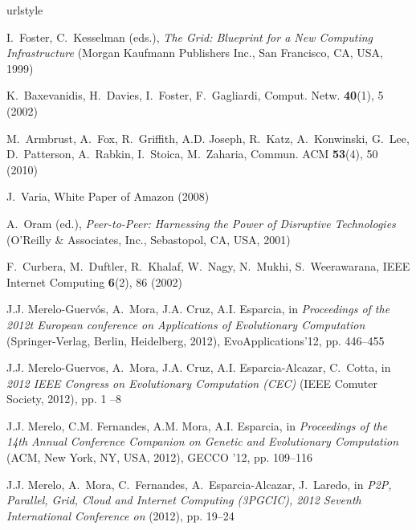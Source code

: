 %
%
\begin{thebibliography}{10}
\providecommand{\url}[1]{{#1}}
\providecommand{\urlprefix}{URL }
\expandafter\ifx\csname urlstyle\endcsname\relax
  \providecommand{\doi}[1]{DOI \discretionary{}{}{}#1}\else
  \providecommand{\doi}{DOI \discretionary{}{}{}\begingroup
  \urlstyle{rm}\Url}\fi

I.~Foster, C.~Kesselman (eds.), \emph{The Grid: Blueprint for a New Computing
  Infrastructure} (Morgan Kaufmann Publishers Inc., San Francisco, CA, USA,
  1999)

K.~Baxevanidis, H.~Davies, I.~Foster, F.~Gagliardi, Comput. Netw.
  \textbf{40}(1), 5 (2002)

M.~Armbrust, A.~Fox, R.~Griffith, A.D. Joseph, R.~Katz, A.~Konwinski, G.~Lee,
  D.~Patterson, A.~Rabkin, I.~Stoica, M.~Zaharia, Commun. ACM \textbf{53}(4),
  50 (2010)

J.~Varia, White Paper of Amazon  (2008)

A.~Oram (ed.), \emph{Peer-to-Peer: Harnessing the Power of Disruptive
  Technologies} (O'Reilly \& Associates, Inc., Sebastopol, CA, USA, 2001)

F.~Curbera, M.~Duftler, R.~Khalaf, W.~Nagy, N.~Mukhi, S.~Weerawarana, IEEE
  Internet Computing \textbf{6}(2), 86 (2002)

J.J. Merelo-Guerv\'{o}s, A.~Mora, J.A. Cruz, A.I. Esparcia, in
  \emph{Proceedings of the 2012t European conference on Applications of
  Evolutionary Computation} (Springer-Verlag, Berlin, Heidelberg, 2012),
  EvoApplications'12, pp. 446--455

J.J. Merelo-Guervos, A.~Mora, J.A. Cruz, A.I. Esparcia-Alcazar, C.~Cotta, in
  \emph{2012 IEEE Congress on Evolutionary Computation (CEC)} (IEEE Comuter
  Society, 2012), pp. 1 --8

J.J. Merelo, C.M. Fernandes, A.M. Mora, A.I. Esparcia, in \emph{Proceedings of
  the 14th Annual Conference Companion on Genetic and Evolutionary Computation}
  (ACM, New York, NY, USA, 2012), GECCO '12, pp. 109--116

J.J. Merelo, A.~Mora, C.~Fernandes, A.~Esparcia-Alcazar, J.~Laredo, in
  \emph{P2P, Parallel, Grid, Cloud and Internet Computing (3PGCIC), 2012
  Seventh International Conference on} (2012), pp. 19--24


\end{thebibliography}
